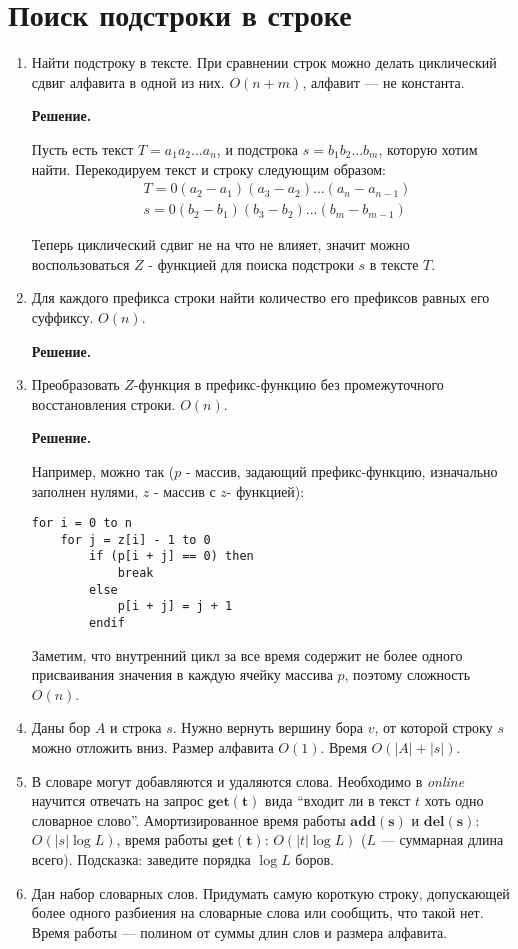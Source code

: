 \section*{Поиск подстроки в строке}
\begin{enumerate}
	\item Найти подстроку в тексте. При сравнении строк можно делать циклический сдвиг алфавита в одной из них. 
	$O(n + m)$, алфавит — не константа.
	
	\textbf{Решение.}
	
	Пусть есть текст $T = a_1a_2...a_n$, и подстрока $s = b_1b_2...b_m$, которую хотим найти. Перекодируем текст и 
	строку следующим образом:
	\begin{align*}
		& T = 0(a_2 - a_1)(a_3 - a_2)...(a_n - a_{n - 1}) \\
		& s = 0(b_2 - b_1)(b_3 - b_2)...(b_m - b_{m - 1})
	\end{align*}
	
	Теперь циклический сдвиг не на что не влияет, значит можно воспользоваться $Z$ - функцией для поиска подстроки 
	$s$ в тексте $T$.
	
	\item Для каждого префикса строки найти количество его префиксов равных его суффиксу. $O(n)$.
	
	\textbf{Решение.}
	
	\item Преобразовать $Z$-функция в префикс-функцию без промежуточного восстановления строки. $O(n)$.
	
	\textbf{Решение.}
	
	Например, можно так ($p$ - массив, задающий префикс-функцию, изначально заполнен нулями, $z$ - массив с $z$- 
	функцией):
	\begin{lstlisting}
for i = 0 to n
	for j = z[i] - 1 to 0
		if (p[i + j] == 0) then
			break
		else
			p[i + j] = j + 1
		endif
	\end{lstlisting}
	
	Заметим, что внутренний цикл за все время содержит не более одного присваивания значения в каждую ячейку 
	массива $p$, поэтому сложность $O(n)$. 
	
	\item Даны бор $A$ и строка $s$. Нужно вернуть вершину бора $v$, от которой строку $s$ можно отложить вниз. 
	Размер алфавита $O(1)$. Время $O(|A| + |s|)$.
	
	\item В словаре могут добавляются и удаляются слова. Необходимо в \textit{online} научится отвечать на запрос 
	$\mathbf{get(t)}$ вида “входит ли в текст $t$ хоть одно словарное слово”. Амортизированное время работы 
	$\mathbf{add(s)}$ и $\mathbf{del(s)}$: $O(|s| \log L)$, время работы $\mathbf{get(t)}$: $O(|t| \log L)$ ($L$ — 
	суммарная длина всего). Подсказка: заведите порядка $\log L$ боров.
	
	\item Дан набор словарных слов. Придумать самую короткую строку, допускающей более одного разбиения на 
	словарные слова или сообщить, что такой нет. Время работы — полином от суммы длин слов и размера алфавита.
\end{enumerate}

